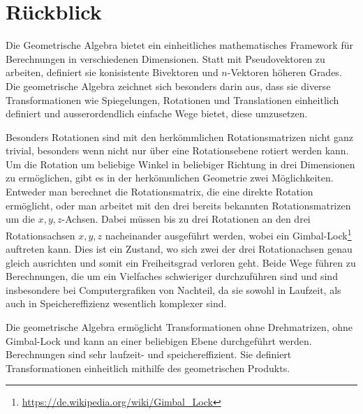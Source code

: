 \section{Rückblick}
Die Geometrische Algebra bietet ein einheitliches mathematisches Framework für Berechnungen
in verschiedenen Dimensionen. Statt mit Pseudovektoren zu arbeiten, definiert sie konisistente
Bivektoren und $n$-Vektoren höheren Grades. Die geometrische Algebra zeichnet sich besonders
darin aus, dass sie diverse Transformationen wie Spiegelungen, Rotationen und Translationen
einheitlich definiert und ausserordendlich einfache Wege bietet, diese umzusetzen.

Besonders Rotationen sind mit den herkömmlichen Rotationsmatrizen nicht ganz trivial, besonders wenn
nicht nur über eine Rotationsebene rotiert werden kann. Um die Rotation um beliebige Winkel in beliebiger
Richtung in drei Dimensionen zu ermöglichen, gibt es in der herkömmlichen Geometrie zwei Möglichkeiten. Entweder
man berechnet die Rotationsmatrix, die eine direkte Rotation ermöglicht, oder man arbeitet mit den drei bereits bekannten
Rotationsmatrizen um die $x, y, z$-Achsen. Dabei müssen bis zu drei
Rotationen an den drei Rotationsachsen $x, y, z$ nacheinander ausgeführt werden, wobei ein
Gimbal-Lock\footnote{\url{https://de.wikipedia.org/wiki/Gimbal_Lock}} auftreten kann. Dies ist ein Zustand, wo sich zwei der drei Rotationachsen genau gleich ausrichten und somit ein Freiheitsgrad verloren geht.
Beide Wege führen zu Berechnungen, die um ein Vielfaches
schwieriger durchzuführen sind und sind insbesondere bei Computergrafiken von Nachteil, da sie sowohl in Laufzeit,
als auch in Speichereffizienz wesentlich komplexer sind.

Die geometrische Algebra ermöglicht Transformationen ohne Drehmatrizen, ohne Gimbal-Lock und kann an einer beliebigen
Ebene durchgeführt werden. Berechnungen sind sehr laufzeit- und speichereffizient.
Sie definiert Transformationen einheitlich mithilfe des geometrischen Produkts.
